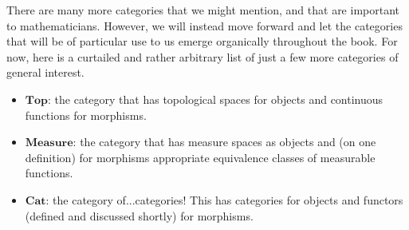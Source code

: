\documentclass[11pt]{book}
\theoremstyle{definition}
\theoremstyle{definition}
\theoremstyle{definition}
\theoremstyle{theorem}
\theoremstyle{definition}
\begin{document}
There are many more categories that we might mention, and that are important to mathematicians. However, we will instead move forward and let the categories that will be of particular use to us emerge organically throughout the book. For now, here is a curtailed and rather arbitrary list of just a few more categories of general interest. 
\begin{itemize}
	\item $\textbf{Top}$: the category that has topological spaces for objects and continuous functions for morphisms. 
	\item $\textbf{Measure}$: the category that has measure spaces as objects and (on one definition) for morphisms appropriate equivalence classes of measurable functions. 
	\item $\textbf{Cat}$: the category of...categories! This has categories for objects and functors (defined and discussed shortly) for morphisms.  
\end{itemize}
\end{document}
